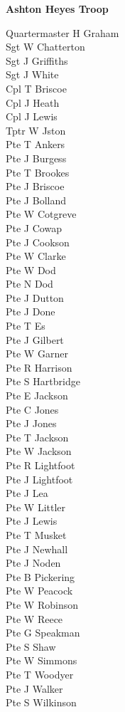 \begin{center}
  \Large
  \textbf{Ashton Heyes Troop}
\end{center}

\begin{multicols}{2}
  \noindent
  Quartermaster H Graham \\
  Sgt W Chatterton \\
  Sgt J Griffiths \\
  Sgt J White \\
  Cpl T Briscoe \\
  Cpl J Heath \\
  Cpl J Lewis \\
  Tptr W Jston \\
  Pte T Ankers \\
  Pte J Burgess \\
  Pte T Brookes \\
  Pte J Briscoe \\
  Pte J Bolland \\
  Pte W Cotgreve \\
  Pte J Cowap \\
  Pte J Cookson \\
  Pte W Clarke \\
  Pte W Dod \\
  Pte N Dod \\
  Pte J Dutton \\
  Pte J Done \\
  Pte T Es \\
  Pte J Gilbert \\
  Pte W Garner \\
  Pte R Harrison \\
  Pte S Hartbridge \\
  Pte E Jackson \\
  Pte C Jones \\
  Pte J Jones \\
  Pte T Jackson \\
  Pte W Jackson \\
  Pte R Lightfoot \\
  Pte J Lightfoot \\
  Pte J Lea \\
  Pte W Littler \\
  Pte J Lewis \\
  Pte T Musket \\
  Pte J Newhall \\
  Pte J Noden \\
  Pte B Pickering \\
  Pte W Peacock \\
  Pte W Robinson \\
  Pte W Reece \\
  Pte G Speakman \\
  Pte S Shaw \\
  Pte W Simmons \\
  Pte T Woodyer \\
  Pte J Walker \\
  Pte S Wilkinson \\
\end{multicols}

